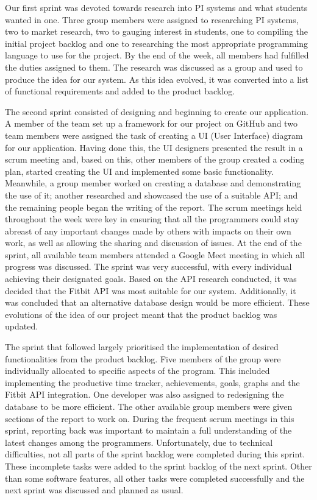 \documentclass[12pt]{article}
\begin{document}
Our first sprint was devoted towards research into PI systems and what students wanted in one. Three group members were assigned to researching PI systems, two to market research, two to gauging interest in students, one to compiling the initial project backlog and one to researching the most appropriate programming language to use for the project. By the end of the week, all members had fulfilled the duties assigned to them. The research was discussed as a group and used to produce the idea for our system. As this idea evolved, it was converted into a list of functional requirements and added to the product backlog.\par

The second sprint consisted of designing and beginning to create our application. A member of the team set up a framework for our project on GitHub and two team members were assigned the task of creating a UI (User Interface) diagram for our application. Having done this, the UI designers presented the result in a scrum meeting and, based on this, other members of the group created a coding plan, started creating the UI and implemented some basic functionality. Meanwhile, a group member worked on creating a database and demonstrating the use of it; another researched and showcased the use of a suitable API; and the remaining people began the writing of the report. The scrum meetings held throughout the week were key in ensuring that all the programmers could stay abreast of any important changes made by others with impacts on their own work, as well as allowing the sharing and discussion of issues. At the end of the sprint, all available team members attended a Google Meet meeting in which all progress was discussed. The sprint was very successful, with every individual achieving their designated goals. Based on the API research conducted, it was decided that the Fitbit API was most suitable for our system. Additionally, it was concluded that an alternative database design would be more efficient. These evolutions of the idea of our project meant that the product backlog was updated.\par

The sprint that followed largely prioritised the implementation of desired functionalities from the product backlog. Five members of the group were individually allocated to specific aspects of the program. This included implementing the productive time tracker, achievements, goals, graphs and the Fitbit API integration. One developer was also assigned to redesigning the database to be more efficient. The other available group members were given sections of the report to work on. During the frequent scrum meetings in this sprint, reporting back was important to maintain a full understanding of the latest changes among the programmers. Unfortunately, due to technical difficulties, not all parts of the sprint backlog were completed during this sprint. These incomplete tasks were added to the sprint backlog of the next sprint. Other than some software features, all other tasks were completed successfully and the next sprint was discussed and planned as usual.\par
\end{document}
